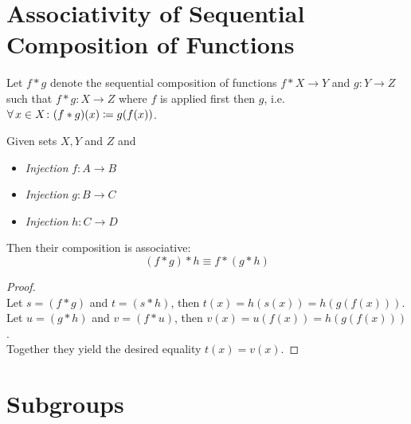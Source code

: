 \section{Associativity of Sequential Composition of Functions}

\begin{definition}
    Let $f \ast g$ denote the sequential composition of functions $f \ast X \to Y$ and $g \colon Y \to Z$ such that $f \ast g \colon X \to Z$ where $f$ is applied first then $g$, i.e. $\operatorname{\forall} x \in X \colon (f \ast g)(x) \coloneqq g(f(x))$.
\end{definition}

\begin{proposition}
    Given sets $X, Y$ and $Z$ and
    \begin{itemize}
        \item \textit{Injection} $f \colon A \to B$
        \item \textit{Injection} $g \colon B \to C$
        \item \textit{Injection} $h \colon C \to D$
    \end{itemize}
    
    Then their composition is associative:
    \begin{equation}
        (f \ast g) \ast h \equiv f \ast (g \ast h)
    \end{equation}
\end{proposition}

\begin{proof}\ \\
    Let $s = (f \ast g)$ and $t = (s \ast h)$, then $t(x) = h(s(x)) = h(g(f(x)))$.\\
    Let $u = (g \ast h)$ and $v = (f \ast u)$, then $v(x) = u(f(x)) = h(g(f(x)))$.\\ 
    Together they yield the desired equality $t(x) = v(x)$.
\end{proof}

\section{Subgroups}

